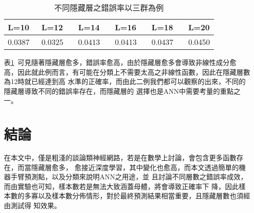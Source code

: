 		\begin{table}[h]				
			\caption{不同隱藏層之錯誤率以三群為例}\label{table:c3Err}
			\centering
			\extrarowheight=8pt
			\begin{tabular}{llllll} 					
				\hline
				L=10\ &L=12 \ &L=14 \ &L=16 \ &L=18 \ &L=20\\ \hline	
				0.0387\ & 0.0325\ & 0.0413\ & 0.0413\ & 0.0437\ & 0.0450\\ \hline	
			\end{tabular}
		\end{table}
		表\ref{table:c3Err}\ 可見隨著隱藏層愈多，錯誤率愈高，由於隱藏層愈多會導致非線性成分愈				高，因此就此例而言，有可能在分類上不需要太高之非線性函數，因此在隱藏層數為12時就已經達到高			水準的正確率，而由此二例我們都可以觀察的出來，不同的隱藏層導致不同的錯誤率存在，而隱藏層的			選擇也是ANN中需要考量的重點之一。
	\section{結論}
		在本文中，僅是粗淺的談論類神經網路，若是在數學上討論，會包含更多函數存在，而當隱藏層愈多，			愈接近深度學習，其中變化也愈高，而本文透過簡單的機器手臂預測點，以及分類來說明ANN之用途，並			且討論不同層數之錯誤率成效，而由實驗也可知，樣本數若是無法大致涵蓋母體，將會導致正確率下				降，因此樣本數的多寡以及樣本數分佈情形，對於最終預測結果相當重要，且隱藏層數也須經由測試得			知效果。
%















